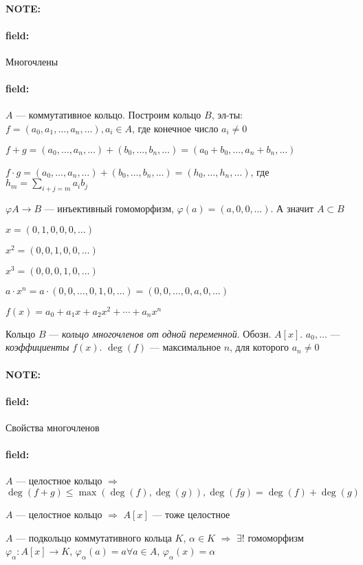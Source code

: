 \documentclass[12pt]{article}
\newenvironment{note}{\paragraph{NOTE:}}{}
\newenvironment{field}{\paragraph{field:}}{}
\begin{document}
\begin{note}
  \begin{field}
    Многочлены
  \end{field}

  \begin{field}
    $A$ --- коммутативное кольцо. Построим кольцо $B$, эл-ты:
    $f = (a_{0}, a_{1}, \ldots, a_{n}, \ldots), a_{i} \in A$,
    где конечное число $a_{i} \neq 0$

    $f + g = (a_{0}, \ldots, a_{n}, \ldots) + (b_{0}, \ldots, b_{n}, \ldots) = (a_{0} + b_{0}, \ldots, a_{n} + b_{n}, \ldots)$

    $f \cdot g = (a_{0}, \ldots, a_{n}, \ldots) + (b_{0}, \ldots, b_{n}, \ldots) = (h_{0}, \ldots, h_{n}, \ldots)$,
    где $h_{m} = \sum_{i + j = m} a_{i}b_{j}$

    $\varphi A \rightarrow B$ --- инъективный гомоморфизм,
    $\varphi(a) = (a, 0, 0, \ldots)$. А значит $A \subset B$

    $x = (0, 1, 0, 0, 0, \ldots)$

    $x^{2} = (0, 0, 1, 0, 0, \ldots)$

    $x^{3} = (0, 0, 0, 1, 0, \ldots)$

    $a \cdot x^{n} = a \cdot (0, 0, \ldots, 0, 1, 0, \ldots) = (0, 0, \ldots, 0, a, 0, \ldots)$

    $f(x) = a_{0} + a_{1}x + a_{2} x^{2} + \cdots + a_{n}x^{n}$

    Кольцо $B$ --- \emph{кольцо многочленов от одной переменной}.
    Обозн. $A[x]$. $a_{0}, \ldots$ --- \emph{коэффициенты} $f(x)$.
    $\deg(f)$ --- максимальное $n$, для которого $a_{n} \neq 0$
  \end{field}
\end{note}

\begin{note}
  \begin{field}
    Свойства многочленов
  \end{field}
  \begin{field}
    $A$ --- целостное кольцо
    $\Rightarrow$
    $\deg (f + g) \leq \max(\deg(f), \deg(g)),
    \deg(fg) = \deg(f) + \deg(g)$


    $A$ --- целостное кольцо
    $\Rightarrow$
    $A[x]$ --- тоже целостное

    $A$ --- подкольцо коммутативного кольца $K$,
    $\alpha \in K$
    $\Rightarrow$
    $\exists! $ гомоморфизм $\varphi_{\alpha} : A[x] \rightarrow K$,
    $\varphi_{\alpha}(a) = a \forall a \in A$,
    $\varphi_{\alpha}(x) = \alpha$
  \end{field}
\end{note}
\end{document}
